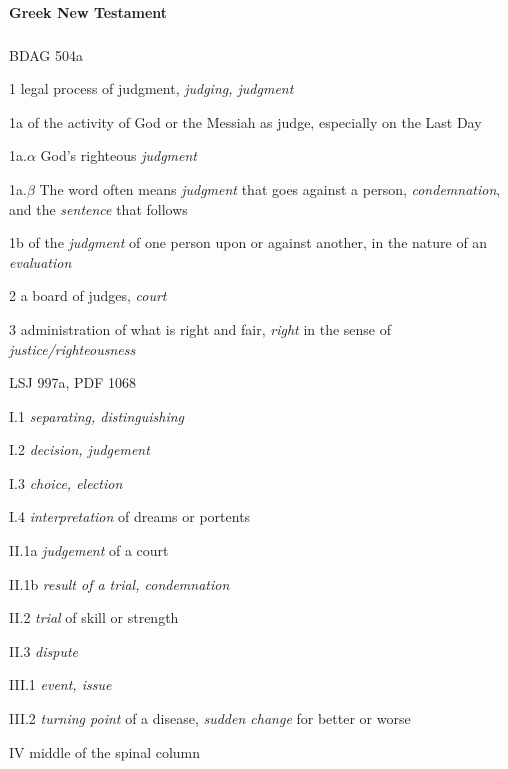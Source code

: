 		\paragraph{Greek New Testament} %
			\label{DAMNATION-GREEK}
		
			\subparagraph{\texorpdfstring{}{}}
				\label{KRISIS}
			
				\begin{compactdesc}
					\item[BDAG 504a] \textbf{}
						\begin{compactitem}
							\item[1] legal process of judgment, \textit{judging, judgment}
							\item[1a] of the activity of God or the Messiah as judge, especially on the Last Day
							\item[1a.$\alpha$] God's righteous \textit{judgment}
							\item[1a.$\beta$] The word often means \textit{judgment} that goes against a person, \textit{condemnation}, and the \textit{sentence} that follows
							\item[1b] of the \textit{judgment} of one person upon or against another, in the nature of an \textit{evaluation}
							\item[2] a board of judges, \textit{court}
							\item[3] administration of what is right and fair, \textit{right} in the sense of \textit{justice/righteousness}
						\end{compactitem}
					\item[LSJ 997a, PDF 1068] \textbf{}
						\begin{compactitem}
							\item[I.1] \textit{separating, distinguishing}
							\item[I.2] \textit{decision, judgement}
							\item[I.3] \textit{choice, election}
							\item[I.4] \textit{interpretation} of dreams or portents
							\item[II.1a] \textit{judgement} of a court
							\item[II.1b] \textit{result of a trial, condemnation}
							\item[II.2] \textit{trial} of skill or strength
							\item[II.3] \textit{dispute}
							\item[III.1] \textit{event, issue}
							\item[III.2] \textit{turning point} of a disease, \textit{sudden change} for better or worse
							\item[IV] middle of the spinal column
						\end{compactitem}
				\end{compactdesc}
				
